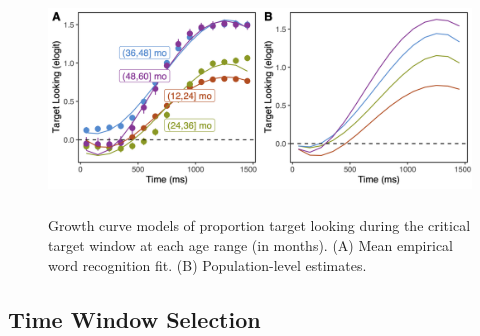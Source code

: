 \documentclass[10pt, letterpaper]{article}
\begin{document}
\begin{figure} 
\includegraphics[width=14cm,height=6cm]{../figures/age_gca.png}
\caption{Growth curve models of proportion target looking during the critical target window at each age range (in months). (A) Mean empirical word recognition fit. (B) Population-level estimates.}
\label{fig:age_gca}
\end{figure}

\hypertarget{time-window-selection}{%
\subsection{Time Window Selection}\label{time-window-selection}}
\end{document}

